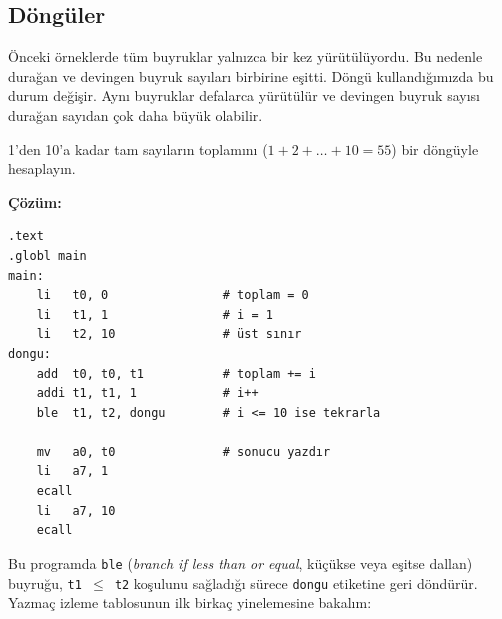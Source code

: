 \subsection{Döngüler}
\label{subsec:donguler}

Önceki örneklerde tüm buyruklar yalnızca bir kez yürütülüyordu. Bu nedenle durağan ve devingen buyruk sayıları birbirine eşitti. Döngü kullandığımızda bu durum değişir. Aynı buyruklar defalarca yürütülür ve devingen buyruk sayısı durağan sayıdan çok daha büyük olabilir.

\begin{ornek}[4.5]
\label{orn:dongu-toplam}
1'den 10'a kadar tam sayıların toplamını ($1 + 2 + \ldots + 10 = 55$) bir döngüyle hesaplayın.

\textbf{Çözüm:}

\begin{lstlisting}[style=riscv]
.text
.globl main
main:
    li   t0, 0                # toplam = 0
    li   t1, 1                # i = 1
    li   t2, 10               # üst sınır
dongu:
    add  t0, t0, t1           # toplam += i
    addi t1, t1, 1            # i++
    ble  t1, t2, dongu        # i <= 10 ise tekrarla

    mv   a0, t0               # sonucu yazdır
    li   a7, 1
    ecall
    li   a7, 10
    ecall
\end{lstlisting}

Bu programda \texttt{ble} (\emph{branch if less than or equal}, küçükse veya eşitse dallan) buyruğu, \texttt{t1~$\leq$~t2} koşulunu sağladığı sürece \texttt{dongu} etiketine geri döndürür. Yazmaç izleme tablosunun ilk birkaç yinelemesine bakalım:


\end{ornek}
